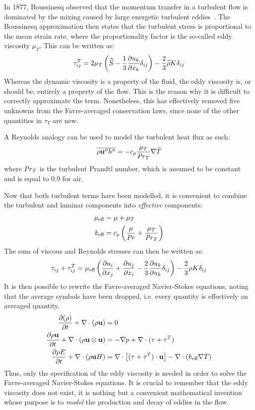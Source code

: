 In 1877, Boussinesq observed that the momentum transfer in a turbulent flow is dominated by the mixing caused by large energetic turbulent eddies~\cite{blazek2015computational}. The Boussinesq approximation then states that the turbulent stress is proportional to the mean strain rate, where the proportionality factor is the so-called eddy viscosity $\mu_T$. This can be written as:
\begin{equation}
    \tau^T_{ij} = 2\mu_T \left(
        \widetilde{S} - \frac{1}{3} \frac{\partial u_k}{\partial x_k} \delta_{ij}
    \right) - \frac{2}{3}\widetilde{\rho}K\delta_{ij}
    \label{eq:bouss}
\end{equation}
Whereas the dynamic viscosity is a property of the fluid, the eddy viscosity is, or should be, entirely a property of the flow. This is the reason why it is difficult to correctly approximate the term. Nonetheless, this has effectively removed five unknowns from the Favre-averaged conservation laws, since none of the other quantities in $\tau_T$ are new.

A Reynolds analogy can be used to model the turbulent heat flux as such:
\begin{equation}
    \overline{\rho \mathbf{u}'' h''} = -c_p\frac{\mu_T}{\mbox{\textit{Pr}}_T}\nabla\widetilde{T}
\end{equation}
where $\mbox{\textit{Pr}}_T$ is the turbulent Prandtl number, which is assumed to be constant and is equal to 0.9 for air.

Now that both turbulent terms have been modelled, it is convenient to combine the turbulent and laminar components into \textit{effective} components:
\begin{align*}
    \mu_{\text{eff}} &= \mu + \mu_T\\
    k_{\text{eff}} &= c_p\left(
        \frac{\mu}{\mbox{\textit{Pr}}} + \frac{\mu_T}{\mbox{\textit{Pr}}_T}
    \right)
\end{align*}
The sum of viscous and Reynolds stresses can then be written as:
\begin{align*}
    \tau_{ij} + \tau_{ij}^T =
        \mu_{\text{eff}}\left(
             \frac{\partial u_i}{\partial x_j}  +  \frac{\partial u_j}{\partial x_i} 
            - \frac{2}{3} \frac{\partial u_k}{\partial u_k} \delta_{ij}
        \right) - \frac{2}{3}\rho K \delta_{ij}
\end{align*}
It is then possible to rewrite the Favre-averaged Navier-Stokes equations, noting that the average symbols have been dropped, i.e. every quantity is effectively an averaged quantity.
\begin{align}
      \frac{\partial (\rho )}{\partial t}  + \nabla \cdot (\rho  \mathbf{u})  &= 0 \label{eq:fansmass}\\
     \frac{\partial \rho \mathbf{u}}{\partial t}  + \nabla\cdot(\rho\mathbf{u}\otimes\mathbf{u}) &=
        -\nabla p + \nabla\cdot(\tau + \tau^T) \label{eq:fansmom}
    \\
     \frac{\partial \rho E}{\partial t}  + \nabla\cdot (\rho \mathbf{u} H) &=
        \nabla\cdot \left[
            (\tau + \tau^T) \cdot \mathbf{u}
        \right]
        - \nabla\cdot\left(k_{\text{eff}}\nabla T\right) \label{eq:fansenergy}
\end{align}
Thus, only the specification of the eddy viscosity is needed in order to solve the Favre-averaged Navier-Stokes equations. It is crucial to remember that the eddy viscosity does not exist, it is nothing but a convenient mathematical invention whose purpose is to \emph{model} the production and decay of eddies in the flow.
%
